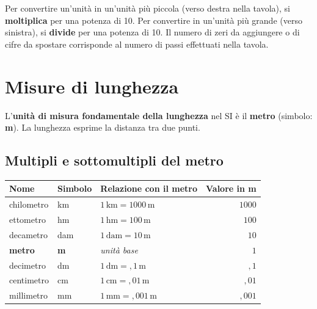 \begin{regola}
    Per convertire un'unità in un'unità più piccola (verso destra nella tavola), si \textbf{moltiplica} per una potenza di 10. Per convertire in un'unità più grande (verso sinistra), si \textbf{divide} per una potenza di 10. Il numero di zeri da aggiungere o di cifre da spostare corrisponde al numero di passi effettuati nella tavola.
\end{regola}

\section{Misure di lunghezza}

\begin{definizione}
    L'\textbf{unità di misura fondamentale della lunghezza} nel SI è il \textbf{metro} (simbolo: \textbf{m}). La lunghezza esprime la distanza tra due punti.
\end{definizione}

\subsection{Multipli e sottomultipli del metro}

\begin{center}
    \begin{tabular}{lllr}
        \toprule
        \textbf{Nome}  & \textbf{Simbolo} & \textbf{Relazione con il metro}   & \textbf{Valore in m} \\
        \midrule
        chilometro     & km               & $1\,\text{km} = 1000\,\text{m}$   & $1000$               \\
        ettometro      & hm               & $1\,\text{hm} = 100\,\text{m}$    & $100$                \\
        decametro      & dam              & $1\,\text{dam} = 10\,\text{m}$    & $10$                 \\
        \textbf{metro} & \textbf{m}       & \textit{unità base}               & $1$                  \\
        decimetro      & dm               & $1\,\text{dm} = {,}1\,\text{m}$   & ${,}1$               \\
        centimetro     & cm               & $1\,\text{cm} = {,}01\,\text{m}$  & ${,}01$              \\
        millimetro     & mm               & $1\,\text{mm} = {,}001\,\text{m}$ & ${,}001$             \\
        \bottomrule
    \end{tabular}
\end{center}

